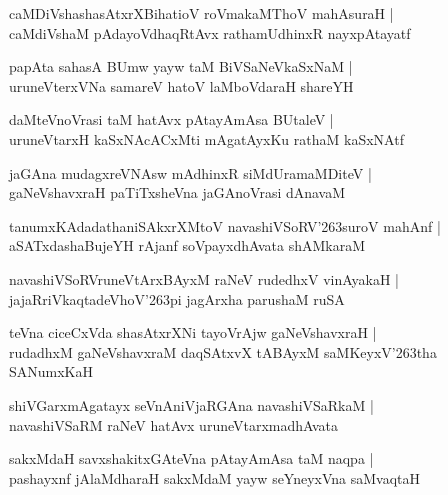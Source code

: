 \documentclass[twoside,12pt,openright]{book}
\def\S{\char'263}
\newcounter{shloka}[chapter]
\begin{document}
\begin{shloka}%
caMDiVshashasAtxrXBihatioV roVmakaMThoV mahAsuraH |\\
caMdiVshaM pAdayoVdhaqRtAvx rathamUdhinxR nayxpAtayatf
\end{shloka}

\begin{shloka}%
papAta sahasA BUmw yayw taM BiVSaNeVkaSxNaM |\\
uruneVterxVNa samareV hatoV laMboVdaraH shareYH
\end{shloka}

\begin{shloka}%
daMteVnoVrasi taM hatAvx pAtayAmAsa BUtaleV |\\
uruneVtarxH kaSxNAcACxMti mAgatAyxKu rathaM kaSxNAtf 
\end{shloka}

\begin{shloka}%
jaGAna mudagxreVNAsw mAdhinxR siMdUramaMDiteV |\\
gaNeVshavxraH paTiTxsheVna jaGAnoVrasi dAnavaM 
\end{shloka}

\begin{shloka}%
tanumxKAdadathaniSAkxrXMtoV navashiVSoRV\S suroV mahAnf |\\
aSATxdashaBujeYH rAjanf soVpayxdhAvata shAMkaraM 
\end{shloka}

\begin{shloka}%
navashiVSoRVruneVtArxBAyxM raNeV rudedhxV vinAyakaH |\\
jajaRriVkaqtadeVhoV\S pi jagArxha parushaM ruSA 
\end{shloka}

\begin{shloka}%
teVna ciceCxVda shasAtxrXNi tayoVrAjw gaNeVshavxraH |\\
rudadhxM gaNeVshavxraM daqSAtxvX tABAyxM saMKeyxV\S tha SANumxKaH
\end{shloka}

\begin{shloka}%
shiVGarxmAgatayx seVnAniVjaRGAna navashiVSaRkaM |\\
navashiVSaRM raNeV hatAvx uruneVtarxmadhAvata
\end{shloka}

\begin{shloka}%
sakxMdaH savxshakitxGAteVna pAtayAmAsa taM naqpa |\\
pashayxnf jAlaMdharaH sakxMdaM yayw seYneyxVna saMvaqtaH 
\end{shloka}
\end{document}
